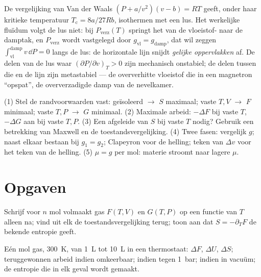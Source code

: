 \begin{remark}\label{rem:b2:thermodynamic-potentials:maxwellconstruction}
De vergelijking van Van der Waals $(P + a/v^2)(v - b) = RT$ geeft, onder haar
kritieke temperatuur $T_{\text{c}} = 8a/27Rb$, isothermen met een lus. Het
werkelijke fluïdum volgt de lus niet: bij $P_{\text{verz}}(T)$ springt het van
de vloeistof- naar de damptak, en $P_{\text{verz}}$ wordt vastgelegd door
$g_{\text{vl}}
= g_{\text{damp}}$, dat wil zeggen
$\int_{\text{vl}}^{\text{damp}}v\,\dd P = 0$ langs de
lus: de horizontale lijn snijdt \emph{gelijke oppervlakken} af. De delen van de
lus waar $(\partial P/\partial v)_T > 0$ zijn mechanisch onstabiel; de
delen tussen die en de lijn zijn metastabiel --- de oververhitte
vloeistof die in een magnetron ``opspat'', de oververzadigde damp van de
nevelkamer.
\end{remark}

\begin{method}\label{meth:b2:thermodynamic-potentials:method}
(1) Stel de randvoorwaarden vast: geïsoleerd $\to$ $S$ maximaal; vaste $T,V$ $\to$
$F$ minimaal; vaste $T,P$ $\to$ $G$ minimaal. (2) Maximale arbeid:
$-\Delta F$ bij vaste
$T$, $-\Delta G$ aan  bij vaste $T,P$. (3) Een afgeleide van
$S$ bij vaste $T$ nodig? Gebruik een betrekking van Maxwell en de
toestandsvergelijking.
(4) Twee fasen: vergelijk $g$; naast elkaar bestaan bij $g_1 = g_2$;
Clapeyron voor de
helling; teken van $\Delta v$ voor het teken van de helling. (5)  $\mu = g$ per mol: materie stroomt naar lagere $\mu$.
\end{method}

\section{Opgaven}

\begin{exercise}[$\star$]\label{exo:b2:thermodynamic-potentials:1}
Schrijf voor $n$ mol volmaakt gas $F(T,V)$ en $G(T,P)$ op een
functie van $T$ alleen na; vind uit elk de toestandsvergelijking terug; toon
aan dat $S = -\partial_TF$ de bekende entropie geeft.
\end{exercise}

\begin{exercise}[$\star$]\label{exo:b2:thermodynamic-potentials:2}
Eén mol gas, \qty{300}{K}, van \qty{1}{L} tot \qty{10}{L} in een
thermostaat: $\Delta F$, $\Delta U$, $\Delta S$; teruggewonnen arbeid indien
omkeerbaar;
indien tegen \qty{1}{bar}; indien in vacuüm; de entropie die in elk
geval wordt gemaakt.
\end{exercise}

